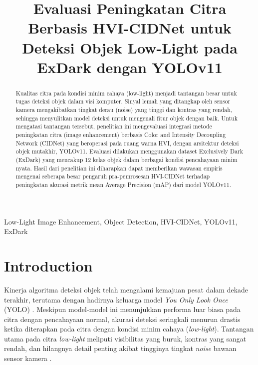 \documentclass[conference]{IEEEtran}
\begin{document}
\title{Evaluasi Peningkatan Citra Berbasis HVI-CIDNet untuk Deteksi Objek Low-Light pada ExDark dengan YOLOv11}

\author{
}

\maketitle

\begin{abstract}
Kualitas citra pada kondisi minim cahaya (low-light) menjadi tantangan besar untuk tugas deteksi objek dalam visi komputer. Sinyal lemah yang ditangkap oleh sensor kamera mengakibatkan tingkat derau (noise) yang tinggi dan kontras yang rendah, sehingga menyulitkan model deteksi untuk mengenali fitur objek dengan baik. Untuk mengatasi tantangan tersebut, penelitian ini mengevaluasi integrasi metode peningkatan citra (image enhancement) berbasis Color and Intensity Decoupling Network (CIDNet) yang beroperasi pada ruang warna HVI, dengan arsitektur deteksi objek mutakhir, YOLOv11. Evaluasi dilakukan menggunakan dataset Exclusively Dark (ExDark) yang mencakup 12 kelas objek dalam berbagai kondisi pencahayaan minim nyata. Hasil dari penelitian ini diharapkan dapat memberikan wawasan empiris mengenai seberapa besar pengaruh pra-pemrosesan HVI-CIDNet terhadap peningkatan akurasi metrik mean Average Precision (mAP) dari model YOLOv11.
\end{abstract}

\begin{IEEEkeywords}
Low-Light Image Enhancement, Object Detection, HVI-CIDNet, YOLOv11, ExDark
\end{IEEEkeywords}

\section{Introduction}
Kinerja algoritma deteksi objek telah mengalami kemajuan pesat dalam dekade terakhir, terutama dengan hadirnya keluarga model \textit{You Only Look Once} (YOLO) \cite{yolo_review}. Meskipun model-model ini menunjukkan performa luar biasa pada citra dengan pencahayaan normal, akurasi deteksi seringkali menurun drastis ketika diterapkan pada citra dengan kondisi minim cahaya (\textit{low-light}). Tantangan utama pada citra \textit{low-light} meliputi visibilitas yang buruk, kontras yang sangat rendah, dan hilangnya detail penting akibat tingginya tingkat \textit{noise} bawaan sensor kamera \cite{exdark}.
\end{document}
